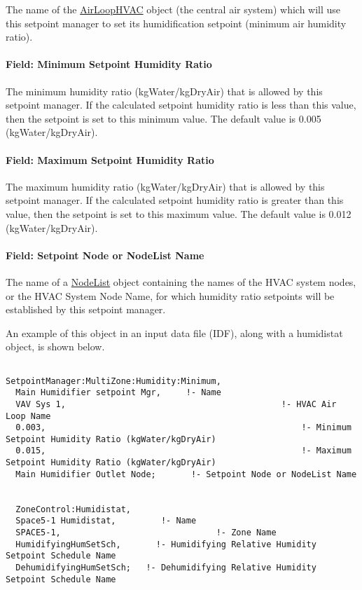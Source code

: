The name of the \hyperref[airloophvac]{AirLoopHVAC} object (the central air system) which will use this setpoint manager to set its humidification setpoint (minimum air humidity ratio).

\paragraph{Field: Minimum Setpoint Humidity Ratio}\label{field-minimum-setpoint-humidity-ratio-3}

The minimum humidity ratio (kgWater/kgDryAir) that is allowed by this setpoint manager. If the calculated setpoint humidity ratio is less than this value, then the setpoint is set to this minimum value. The default value is 0.005 (kgWater/kgDryAir).

\paragraph{Field: Maximum Setpoint Humidity Ratio}\label{field-maximum-setpoint-humidity-ratio-3}

The maximum humidity ratio (kgWater/kgDryAir) that is allowed by this setpoint manager. If the calculated setpoint humidity ratio is greater than this value, then the setpoint is set to this maximum value. The default value is 0.012 (kgWater/kgDryAir).

\paragraph{Field: Setpoint Node or NodeList Name}\label{field-setpoint-node-or-nodelist-name-17}

The name of a \hyperref[nodelist]{NodeList} object containing the names of the HVAC system nodes, or the HVAC System Node Name, for which humidity ratio setpoints will be established by this setpoint manager.

An example of this object in an input data file (IDF), along with a humidistat object, is shown below.

\begin{lstlisting}

SetpointManager:MultiZone:Humidity:Minimum,
  Main Humidifier setpoint Mgr,     !- Name
  VAV Sys 1,                                           !- HVAC Air Loop Name
  0.003,                                                   !- Minimum Setpoint Humidity Ratio (kgWater/kgDryAir)
  0.015,                                                   !- Maximum Setpoint Humidity Ratio (kgWater/kgDryAir)
  Main Humidifier Outlet Node;       !- Setpoint Node or NodeList Name


  ZoneControl:Humidistat,
  Space5-1 Humidistat,         !- Name
  SPACE5-1,                               !- Zone Name
  HumidifyingHumSetSch,       !- Humidifying Relative Humidity Setpoint Schedule Name
  DehumidifyingHumSetSch;   !- Dehumidifying Relative Humidity Setpoint Schedule Name
\end{lstlisting}

